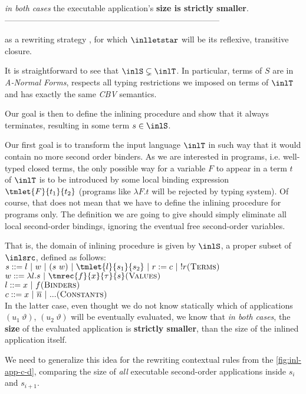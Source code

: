 	\textit{in both cases} the executable application's \textbf{size is strictly smaller}.  
------------------------------------------------------------------------------


as a rewriting strategy 
, for which $\inlletstar$ will be its reflexive, transitive closure.

It is straightforward to see that $\inlS \subsetneq \inlT$. In particular,
terms of $S$ are in \textit{A-Normal Forms}, respects all typing restrictions 
we imposed on terms of $\inlT$ and has exactly the same \textit{CBV} semantics. 

Our goal is then to define the inlining procedure and show that it always
terminates, resulting in some term $s \in \inlS$.


Our first goal is to transform the input language $\inlT$ in such way that it
would contain no more second order binders. As we are interested in programs, 
i.e. well-typed closed terms, the only possible way for a variable $F$ to 
appear in a term $t$ of $\inlT$ is to be introduced by some local binding 
expression $\tmlet{F}{t_1}{t_2}$ (programs like $\lambda F. t$ will be
rejected by typing system). Of course, that does not mean that we have to define 
the inlining procedure for programs only. The definition we are going to give
should simply eliminate all local second-order bindings, ignoring the eventual
free second-order variables.


That is, the domain of inlining procedure is given by $\inlS$, a proper subset of $\inlsrc$, defined as follows:\\
  $ s ::= l~|~w~|~(s~w) ~|~ \tmlet{l}{s_1}{s_2} ~|~ r:= c ~|~ !r \hfill \textsc{(Terms)}$ \\\indent 
  $ w ::= \lambda l. s ~|~ \tmrec{f}{x}{\tau}{s}\hfill \textsc{(Values)}$ \\\indent 
  $ l ::= x ~|~ f \hfill \textsc{(Binders)}$ \\\indent 
  $ c ::= x ~|~ \overline{n}~|~... \hfill \textsc{(Constants)}$\\[1em]

In the latter case, even thought we do not know statically which of applications $(u_1~\vartheta)$, $(u_2~\vartheta)$  will be eventually evaluated, we  know that  \textit{in both cases},  the \textbf{size} of the evaluated application is \textbf{strictly smaller}, than the size of the inlined application itself.
	
	We need to generalize this idea for the rewriting contextual rules from the \cref{fig:inl-app-c-d}, comparing the size of \textit{all} executable second-order applications inside $s_{i}$ and $s_{i+1}$. 
	
